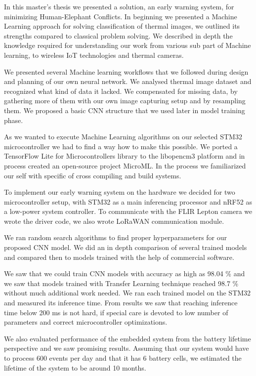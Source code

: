 In this master's thesis we presented a solution, an early warning system, for minimizing Human-Elephant Conflicts.
In beginning we presented a Machine Learning approach for solving classification of thermal images, we outlined its strengths compared to classical problem solving.
We described in depth the knowledge required for understanding our work from various sub part of Machine learning, to wireless IoT technologies and thermal cameras.

We presented several Machine learning workflows that we followed during design and planning of our own neural network.
We analysed thermal image dataset and recognized what kind of data it lacked. 
We compensated for missing data, by gathering more of them with our own image capturing setup and by resampling them.
We proposed a basic CNN structure that we used later in model training phase.

As we wanted to execute Machine Learning algorithms on our selected STM32 microcontroller we had to find a way how to make this possible.
We ported a TensorFlow Lite for Microcontrollers library to the libopencm3 platform and in process created an open-source project MicroML.
In the process we familiarized our self with specific of cross compiling and build systems.

To implement our early warning system on the hardware we decided for two microcontroller setup, with STM32 as a main inferencing processor and nRF52 as a low-power system controller.
To communicate with the FLIR Lepton camera we wrote the driver code, we also wrote LoRaWAN communication module.

We ran random search algorithms to find proper hyperparameters for our proposed CNN model.
We did an in depth comparison of several trained models and compared then to models trained with the help of commercial software.

We saw that we could train CNN models with accuracy as high as 98.04 \% and we saw that models trained with Transfer Learning technique reached 98.7 \% without much additional work needed.
We ran each trained model on the STM32 and measured its inference time.
From results we saw that reaching inference time below 200 \si{\milli\second} is not hard, if special care is devoted to low number of parameters and correct microcontroller optimizations.

We also evaluated performance of the embedded system from the battery lifetime perspective and we saw promising results.
Assuming that our system would have to process 600 events per day and that it has 6 battery cells, we estimated the lifetime of the system to be around 10 months.

